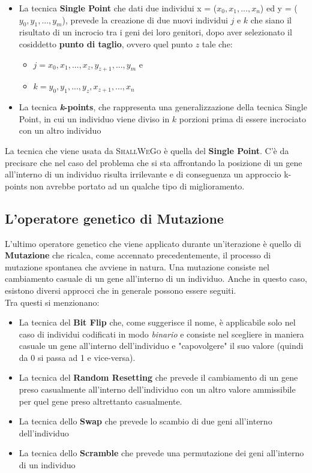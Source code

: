         \begin{itemize}
            \item La tecnica \textbf{Single Point} che dati due individui x = ($x_{0}, x_{1}, ..., x_{n}$) ed y = ($y_{0}, y_{1}, ..., y_{m}$), prevede la creazione di due nuovi individui $j$ e $k$ che siano il risultato di un incrocio tra i geni dei loro genitori, dopo aver selezionato il cosiddetto \textbf{punto di taglio}, ovvero quel punto $z$ tale che:
                \begin{itemize}
                    \item $j = x_{0}, x_{1}, ..., x_{z}, y_{z+1}, ..., y_{m}$ e
                    \item $k = y_{0}, y_{1}, ..., y_{z}, x_{z+1}, ..., x_{n}$
                \end{itemize}
            \item La tecnica \textbf{\textit{k}-points}, che rappresenta una generalizzazione della tecnica Single Point, in cui un individuo viene diviso in \textit{$k$} porzioni prima di essere incrociato con un altro individuo
        \end{itemize}
        La tecnica che viene usata da \textsc{ShallWeGo} è quella del \textbf{Single Point}. C'è da precisare che nel caso del problema che si sta affrontando la posizione di un gene all'interno di un individuo risulta irrilevante e di conseguenza un approccio k-points non avrebbe portato ad un qualche tipo di miglioramento.
    \subsection{L'operatore genetico di Mutazione}
        L'ultimo operatore genetico che viene applicato durante un'iterazione è quello di \textbf{Mutazione} che ricalca, come accennato precedentemente, il processo di mutazione spontanea che avviene in natura. Una mutazione consiste nel cambiamento casuale di un gene all'interno di un individuo. Anche in questo caso, esistono diversi approcci che in generale possono essere seguiti. \\
        Tra questi si menzionano:
        \begin{itemize}
            \item La tecnica del \textbf{Bit Flip} che, come suggerisce il nome, è applicabile solo nel caso di individui codificati in modo \textit{binario} e consiste nel scegliere in maniera casuale un gene all'interno dell'individuo e "capovolgere" il suo valore (quindi da 0 si passa ad 1 e vice-versa).
            \item La tecnica del \textbf{Random Resetting} che prevede il cambiamento di un gene preso casualmente all'interno dell'individuo con un altro valore ammissibile per quel gene preso altrettanto casualmente.
            \item La tecnica dello \textbf{Swap} che prevede lo scambio di due geni all'interno dell'individuo
            \item La tecnica dello \textbf{Scramble} che prevede una permutazione dei geni all'interno di un individuo
        \end{itemize}

